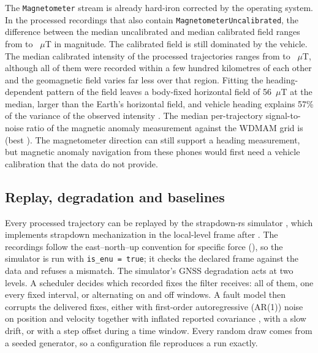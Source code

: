 The \texttt{Magnetometer} stream is already hard-iron corrected by the operating system. In the \numHardIronCount{} processed recordings that also contain \texttt{MagnetometerUncalibrated}, the difference between the median uncalibrated and median calibrated field ranges from \numHardIronMin{} to \numHardIronMax~\(\mu\)T in magnitude. The calibrated field is still dominated by the vehicle. The median calibrated intensity of the processed trajectories ranges from \numMagIntensityMin{} to \numMagIntensityMax~\(\mu\)T, although all of them were recorded within a few hundred kilometres of each other and the geomagnetic field \citep{wmm} varies far less over that region. Fitting the heading-dependent pattern of the field leaves a body-fixed horizontal field of 56~\(\mu\)T at the median, larger than the Earth's horizontal field, and vehicle heading explains 57\% of the variance of the observed intensity \citep{brodovsky2026dissertation}. The median per-trajectory signal-to-noise ratio of the magnetic anomaly measurement against the WDMAM grid is \numSnrMagnetic{} (best \numSnrMagneticBest). The magnetometer direction can still support a heading measurement, but magnetic anomaly navigation from these phones would first need a vehicle calibration that the data do not provide.

\subsection{Replay, degradation and baselines}
\label{sec:benchmark}

Every processed trajectory can be replayed by the strapdown-rs simulator \citep{strapdown-rs}, which implements strapdown mechanization in the local-level frame after \citet{groves}. The recordings follow the east--north--up convention for specific force (), so the simulator is run with \texttt{is\_enu = true}; it checks the declared frame against the data and refuses a mismatch. The simulator's GNSS degradation acts at two levels. A scheduler decides which recorded fixes the filter receives: all of them, one every fixed interval, or alternating on and off windows. A fault model then corrupts the delivered fixes, either with first-order autoregressive (AR(1)) noise on position and velocity together with inflated reported covariance \citep{wang2022noise}, with a slow drift, or with a step offset during a time window. Every random draw comes from a seeded generator, so a configuration file reproduces a run exactly.


